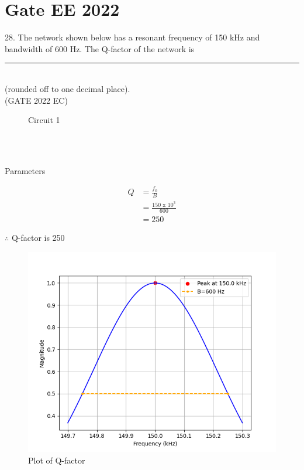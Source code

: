 \documentclass[journal,12pt,twocolumn]{IEEEtran}
\begin{document}


\vspace{3cm}

\title{}
\author{EE23BTECH11054 -  Sai Krishna Shanigarapu$^{*}$
}
\maketitle
\newpage
\bigskip

\section*{Gate EE 2022}
28. \hspace{2pt}The network shown below has a resonant frequency of 150 kHz and bandwidth of 600
Hz. The Q-factor of the network is \rule{1cm}{0.15mm}\\
(rounded off to one decimal place).\\
\hfill(GATE 2022 EC)\\
\begin{figure}[ht]
  \centering
      
  \caption{Circuit 1}
\end{figure}\\
\solution\\

\begin{table}[ht]
    \centering
    \begin{adjustbox}{width=\columnwidth}
    
    \end{adjustbox}
    \caption{Parameters}
    \label{tab:tab1_gate_ee_2022_28_054}
\end{table}
\begin{align}
    Q &= \frac{f_0}{B}\\
    &=\frac{150 \text{ x } 10^3}{600}\\
    &= 250
\end{align}

$\therefore$ Q-factor is 250

\begin{figure}
    \centering
    \includegraphics[width=\columnwidth]{figs/Figure_1.png}
    \caption{Plot of Q-factor}
    \label{fig:fig1_gate_ee_2022_18_054}
\end{figure}
\end{document}
